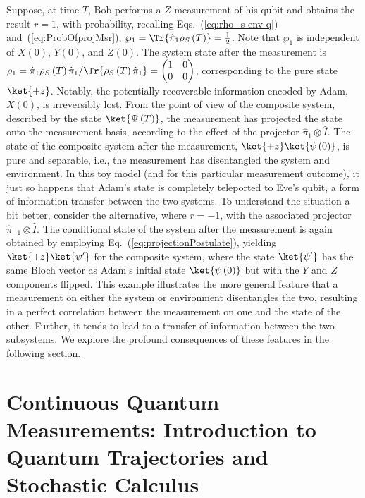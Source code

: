 Suppose, at time $T$, Bob performs a $Z$ measurement of his qubit
and obtains the result $r=1$, with probability, recalling Eqs.~(\ref{eq:rho_s-env-q})
and~(\ref{eq:ProbOfprojMsr}), $\wp_{1}=\Tr{\hat{\pi}_{1}\rho_{S}\left(T\right)}=\frac{1}{2}$.
Note that $\wp_{1}$ is independent of $X\left(0\right)$, $Y\left(0\right)$,
and $Z\left(0\right)$. The system state after the measurement is
$\rho_{1}=\hat{\pi}_{1}\rho_{S}\left(T\right)\hat{\pi}_{1}/\Tr{\rho_{S}\left(T\right)\hat{\pi}_{1}}=\begin{pmatrix}1 & 0\\
0 & 0
\end{pmatrix}$, corresponding to the pure state $\ket{+z}$. Notably, the potentially
recoverable information encoded by Adam, $X(0)$, is irreversibly
lost. From the point of view of the composite system, described by
the state $\ket{\Psi\left(T\right)}$, the measurement has projected
the state onto the measurement basis, according to the effect of the
projector $\hat{\pi}_{1}\otimes\hat{I}$. The state of the composite
system after the measurement, $\ket{+z}\ket{\psi\left(0\right)}$,
is pure and separable, i.e., the measurement has disentangled the
system and environment. In this toy model (and for this particular
measurement outcome), it just so happens that Adam's state is completely
teleported to Eve's qubit, a form of information transfer between
the two systems. To understand the situation a bit better, consider
the alternative, where $r=-1$, with the associated projector $\hat{\pi}_{-1}\otimes\hat{I}$.
The conditional state of the system after the measurement is again
obtained by employing Eq.~(\ref{eq:projectionPostulate}), yielding
$\ket{+z}\ket{\psi'}$ for the composite system, where the state $\ket{\psi'}$
has the same Bloch vector as Adam's initial state $\ket{\psi\left(0\right)}$
but with the $Y$ and $Z$ components flipped. This example illustrates
the more general feature that a measurement on either the system or
environment disentangles the two, resulting in a perfect correlation
between the measurement on one and the state of the other. Further,
it tends to lead to a transfer of information between the two subsystems.
We explore the profound consequences of these features in the following
section.


\section{Continuous Quantum Measurements: Introduction to Quantum Trajectories
and Stochastic Calculus \label{sec:Introductory-example:-qubit} }

